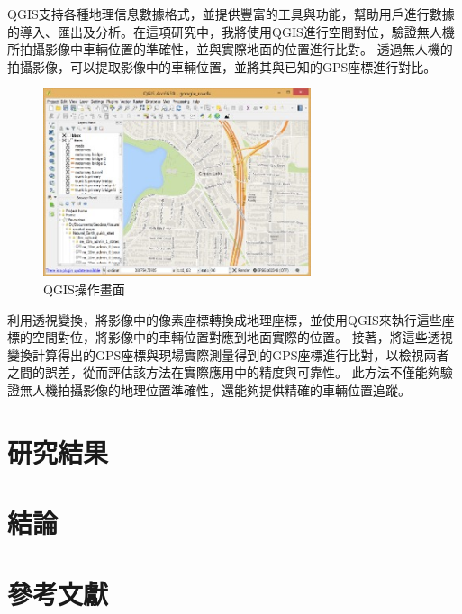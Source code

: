 \documentclass[12pt]{article}       %
\begin{document}
QGIS支持各種地理信息數據格式，並提供豐富的工具與功能，幫助用戶進行數據的導入、匯出及分析。在這項研究中，我將使用QGIS進行空間對位，驗證無人機所拍攝影像中車輛位置的準確性，並與實際地面的位置進行比對。
透過無人機的拍攝影像，可以提取影像中的車輛位置，並將其與已知的GPS座標進行對比。
\begin{figure}[H]
    \centering
    \includegraphics[width=0.7\textwidth]{qgis.jpg}     %
    \caption{QGIS操作畫面\cite{qgis_2020}}    %
    \label{fig:qgis}    %
\end{figure}
利用透視變換，將影像中的像素座標轉換成地理座標，並使用QGIS來執行這些座標的空間對位，將影像中的車輛位置對應到地面實際的位置。
接著，將這些透視變換計算得出的GPS座標與現場實際測量得到的GPS座標進行比對，以檢視兩者之間的誤差，從而評估該方法在實際應用中的精度與可靠性。
此方法不僅能夠驗證無人機拍攝影像的地理位置準確性，還能夠提供精確的車輛位置追蹤。
















\section{\centering 研究結果}





\section{\centering 結論} 




\section{\centering 參考文獻}
\vspace{-3.5em}  %
\renewcommand{\refname}{}  %
\printbibliography  %
\end{document}
